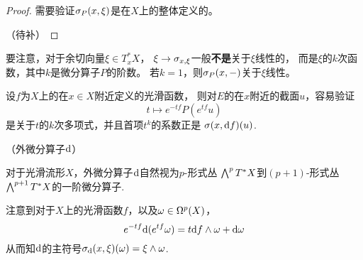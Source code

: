 \begin{proof}
需要验证$\sigma_P(x,\xi)$是在$X$上的整体定义的。

{\color{red}（待补）}
\end{proof}

\begin{rem}
要注意，对于余切向量$\xi\in T^*_xX$，
$\xi\to\sigma_{x,\xi}$一般\textbf{不是}关于$\xi$线性的，
而是$\xi$的$k$次函数，其中$k$是微分算子$P$的阶数。
若$k=1$，则$\sigma_P(x,-)$关于$\xi$线性。
\end{rem}

\begin{rem}设$f$为$X$上的在$x\in X$附近定义的光滑函数，
则对$E$的在$x$附近的截面$u$，容易验证
$$t\mapsto e^{-tf}P(e^{tf}u)$$
是关于$t$的$k$次多项式，并且首项$t^k$的系数正是
$\sigma(x,\mathrm{d} f)(u)$.
\end{rem}


\begin{example}（外微分算子$\mathrm{d}$）

对于光滑流形$X$，外微分算子$\mathrm{d}$自然视为$p$-形式丛
$\bigwedge\nolimits^{p}T^*X$到$(p+1)$-形式丛
$\bigwedge\nolimits^{p+1}T^*X$的一阶微分算子.
\end{example}
注意到对于$X$上的光滑函数$f$，以及$\omega\in\Omega^p(X)$，
$$e^{-tf}\mathrm{d}(e^{tf}\omega)=t\mathrm{d} f\wedge\omega+\mathrm{d} \omega$$
从而知$\mathrm{d}$的主符号$\sigma_{\mathrm{d}}(x,\xi)(\omega)=\xi\wedge\omega$.


